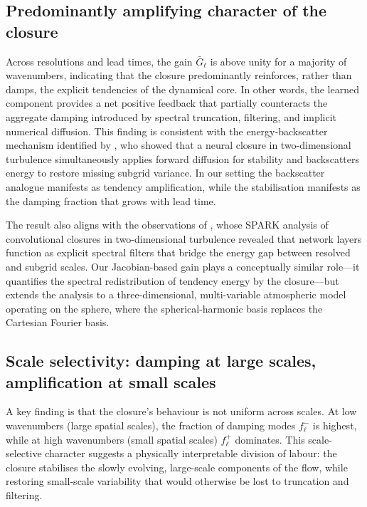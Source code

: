 \subsection{Predominantly amplifying character of the closure}

Across resolutions and lead times, the gain $\bar{G}_\ell$ is above unity for a majority of wavenumbers, indicating that the closure predominantly reinforces, rather than damps, the explicit tendencies of the dynamical core. In other words, the learned component provides a net positive feedback that partially counteracts the aggregate damping introduced by spectral truncation, filtering, and implicit numerical diffusion. This finding is consistent with the energy-backscatter mechanism identified by \citet{guan2022stable}, who showed that a neural closure in two-dimensional turbulence simultaneously applies forward diffusion for stability and backscatters energy to restore missing subgrid variance. In our setting the backscatter analogue manifests as tendency amplification, while the stabilisation manifests as the damping fraction that grows with lead time.

The result also aligns with the observations of \citet{subel2023explaining}, whose SPARK analysis of convolutional closures in two-dimensional turbulence revealed that network layers function as explicit spectral filters that bridge the energy gap between resolved and subgrid scales. Our Jacobian-based gain plays a conceptually similar role---it quantifies the spectral redistribution of tendency energy by the closure---but extends the analysis to a three-dimensional, multi-variable atmospheric model operating on the sphere, where the spherical-harmonic basis replaces the Cartesian Fourier basis.

\subsection{Scale selectivity: damping at large scales, amplification at small scales}

A key finding is that the closure's behaviour is not uniform across scales. At low wavenumbers (large spatial scales), the fraction of damping modes $f^{-}_\ell$ is highest, while at high wavenumbers (small spatial scales) $f^{+}_\ell$ dominates. This scale-selective character suggests a physically interpretable division of labour: the closure stabilises the slowly evolving, large-scale components of the flow, while restoring small-scale variability that would otherwise be lost to truncation and filtering.

